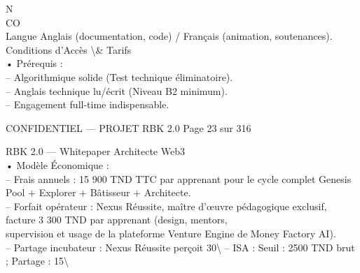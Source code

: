 \documentclass[12pt,landscape,a4paper]{article}
\newenvironment{confidential}
{\begin{tcolorbox}[
    colback=rbkred!5!white,
    colframe=rbkred!75!black,
    title=CONFIDENTIEL,
    fonttitle=\bfseries\color{white},
    coltitle=rbkred!75!black,
    breakable,
    enhanced,
    frame hidden,
    borderline west={2pt}{0pt}{rbkred!75!black}
]}
{\end{tcolorbox}}
\begin{document}
N\\
CO\\
Langue                      Anglais (documentation, code) / Français (animation, soutenances).\\
\vspace{0.5em}
\vspace{0.5em}
\vspace{0.5em}
Conditions d’Accès \textbackslash{}& Tarifs\\
• Prérequis :\\
\vspace{0.5em}
– Algorithmique solide (Test technique éliminatoire).\\
– Anglais technique lu/écrit (Niveau B2 minimum).\\
– Engagement full-time indispensable.\\
\vspace{0.5em}
\vspace{0.5em}
\begin{confidential}CONFIDENTIEL — PROJET RBK 2.0                                 Page 23 sur 316\end{confidential}
RBK 2.0 — Whitepaper Architecte Web3\\
\vspace{0.5em}
\vspace{0.5em}
• Modèle Économique :\\
\vspace{0.5em}
– Frais annuels : 15 900 TND TTC par apprenant pour le cycle complet Genesis Pool + Explorer + Bâtisseur + Architecte.\\
\vspace{0.5em}
\vspace{0.5em}
– Forfait opérateur : Nexus Réussite, maître d’œuvre pédagogique exclusif, facture 3 300 TND par apprenant (design, mentors,\\
supervision et usage de la plateforme Venture Engine de Money Factory AI).\\
\vspace{0.5em}
\vspace{0.5em}
– Partage incubateur : Nexus Réussite perçoit 30\textbackslash{}%
\vspace{0.5em}
\vspace{0.5em}
– ISA : Seuil : 2500 TND brut ; Partage : 15\textbackslash{}%
\end{document}
